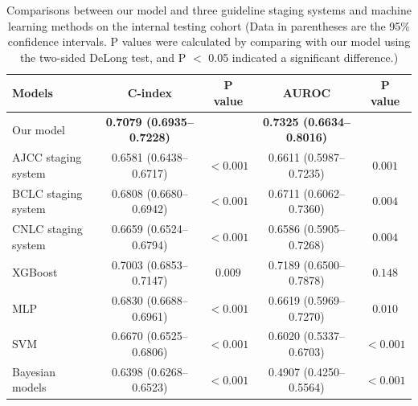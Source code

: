 \documentclass{article}
\begin{document}
\begin{table}[htbp]
    \centering
    \renewcommand\arraystretch{1.1}
    \setlength{\tabcolsep}{2.2mm}
    
    \caption{Comparisons between our model and three guideline staging systems and machine learning methods on the internal testing cohort (Data in parentheses are the 95\% confidence intervals. P values were calculated by comparing with our model using the two-sided DeLong test, and P $<$ 0.05 indicated a significant difference.)}
    \begin{tabular}{lcccc}
    \toprule
        Models & C-index & P value & AUROC & P value \\ \midrule
        Our model & \textbf{0.7079 (0.6935–0.7228)} & ~ & \textbf{0.7325 (0.6634–0.8016)} & ~ \\ 
        AJCC staging system & 0.6581 (0.6438–0.6717) & $<0.001$ & 0.6611 (0.5987–0.7235) & $0.001$ \\ 
        BCLC staging system & 0.6808 (0.6680–0.6942) & $<0.001$ & 0.6711 (0.6062–0.7360) & $0.004$ \\ 
        CNLC staging system & 0.6659 (0.6524–0.6794) & $<0.001$ & 0.6586 (0.5905–0.7268) & $0.004$ \\ \midrule
        XGBoost & 0.7003 (0.6853–0.7147) & $0.009$ & 0.7189 (0.6500–0.7878) & $0.148$ \\
        MLP & 0.6830 (0.6688–0.6961) & $<0.001$ & 0.6619 (0.5969–0.7270) & $0.010$ \\ 
        SVM & 0.6670 (0.6525–0.6806) & $<0.001$ & 0.6020 (0.5337–0.6703) & $<0.001$ \\ 
        Bayesian models & 0.6398 (0.6268–0.6523) & $<0.001$ & 0.4907 (0.4250–0.5564) & $<0.001$ \\ \bottomrule
    \end{tabular}
    \label{tab:cindex_auc_internal}
\end{table}
\end{document}
